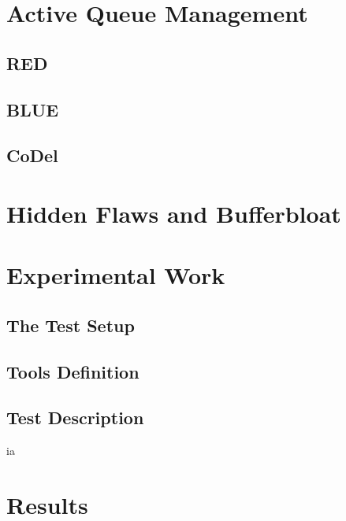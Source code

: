 \documentclass[letter, 11pt]{article}
\theoremstyle{plain}
\theoremstyle{definition}
\begin{document}

\newpage

\section{Active Queue Management}

\subsection{RED}

\subsection{BLUE}

\subsection{CoDel}


\newpage

\section{Hidden Flaws and Bufferbloat}


\newpage

\section{Experimental Work}


\subsection{The Test Setup}


\subsection{Tools Definition}


\subsection{Test Description}

ia	
\newpage
\section{Results}

\end{document}
